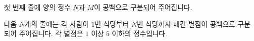첫 번째 줄에 양의 정수 $N$과 $M$이 공백으로 구분되어 주어집니다.

다음 $N$개의 줄에는 각 사람이 $1$번 식당부터 $N$번 식당까지 매긴 별점이 공백으로 구분되어 주어집니다. 각 별점은 $1$ 이상 $5$ 이하의 정수입니다.